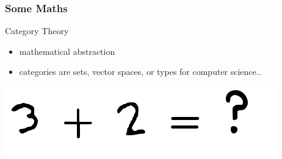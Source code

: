 \documentclass[12pt, xcolor=table]{beamer}
\begin{document}
%
%
%

\begin{frame}
    \frametitle{Some Maths}
        \begin{block}{Category Theory}
        \begin{itemize}
            \item mathematical abstraction
            \item categories are sets, vector spaces, or types for computer science..
        \end{itemize}
        \end{block}
        \vspace{30px}
        \hspace*{\fill}\includegraphics[scale=0.3]{figures/maths.png}
\end{frame}
\end{document}
